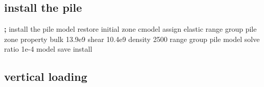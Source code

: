 \documentclass[a4paper, nobind]{templates/ociamthesis}
\newenvironment{Shaded}{\begin{snugshade}}{\end{snugshade}}
\newcommand{\BuiltInTok}[1]{#1}
\newcommand{\DecValTok}[1]{\textcolor[rgb]{0.00,0.00,0.81}{#1}}
\newcommand{\FloatTok}[1]{\textcolor[rgb]{0.00,0.00,0.81}{#1}}
\newcommand{\NormalTok}[1]{#1}
\newcommand{\OperatorTok}[1]{\textcolor[rgb]{0.81,0.36,0.00}{\textbf{#1}}}
\newcommand{\StringTok}[1]{\textcolor[rgb]{0.31,0.60,0.02}{#1}}
\renewenvironment{Shaded}
{
  \vspace{10pt}%
  \begin{snugshade}%
}{%
  \end{snugshade}%
  \vspace{8pt}%
}
\begin{document}
\hypertarget{install-the-pile}{%
\subsection{install the pile}\label{install-the-pile}}

\begin{Shaded}
\begin{Highlighting}[]
\OperatorTok{;}\NormalTok{ install the pile}
\NormalTok{model restore }\StringTok{\textquotesingle{}initial\textquotesingle{}}
\NormalTok{zone cmodel assign elastic                          }\BuiltInTok{range}\NormalTok{ group }\StringTok{\textquotesingle{}pile\textquotesingle{}}
\NormalTok{zone }\BuiltInTok{property}\NormalTok{ bulk }\FloatTok{13.9e9}\NormalTok{ shear }\FloatTok{10.4e9}\NormalTok{ density }\DecValTok{2500} \BuiltInTok{range}\NormalTok{ group }\StringTok{\textquotesingle{}pile\textquotesingle{}}
\NormalTok{model solve ratio }\FloatTok{1e{-}4}
\NormalTok{model save }\StringTok{\textquotesingle{}install\textquotesingle{}}
\end{Highlighting}
\end{Shaded}

\hypertarget{vertical-loading-1}{%
\subsection{vertical loading}\label{vertical-loading-1}}
\end{document}
